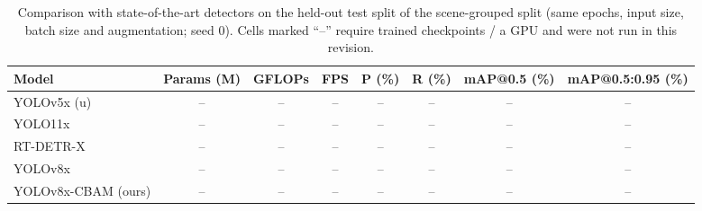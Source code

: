 \begin{table}[!t]
\centering
\caption{Comparison with state-of-the-art detectors on the held-out test split of the scene-grouped split
(same epochs, input size, batch size and augmentation; seed 0). Cells marked ``--'' require trained checkpoints / a GPU and were not run in this revision.}
\label{tab:sota}
\begin{tabular}{lccccccc}
\toprule
Model & Params (M) & GFLOPs & FPS & P (\%) & R (\%) & mAP@0.5 (\%) & mAP@0.5:0.95 (\%) \\
\midrule
YOLOv5x (u) & -- & -- & -- & -- & -- & -- & -- \\
YOLO11x & -- & -- & -- & -- & -- & -- & -- \\
RT-DETR-X & -- & -- & -- & -- & -- & -- & -- \\
YOLOv8x & -- & -- & -- & -- & -- & -- & -- \\
YOLOv8x-CBAM (ours) & -- & -- & -- & -- & -- & -- & -- \\
\bottomrule
\end{tabular}
\end{table}

